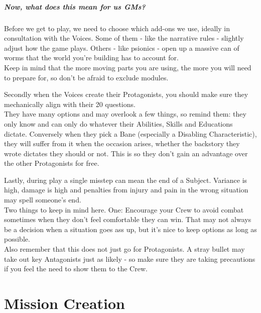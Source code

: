 \documentclass[12pt,a4paper,openany,usenames,dvipsnames]{book}
\begin{document}
	\paragraph{Now, what does this mean for us GMs?}
	\def\hspacepar{5mm}
	\def\vspacepar{-5mm}
	Before we get to play, we need to choose which add-ons we use,
		ideally in consultation with the Voices.
	Some of them - like the narrative rules - slightly adjust how the game plays. Others - like psionics - open up a massive can of worms that the world you're building has to account for.\\
	\hspace*{\hspacepar} Keep in mind that the more moving parts you are using, the more you will need to prepare for, so don't be afraid to exclude modules.\par \vspace{\vspacepar}
	Secondly when the Voices create their Protagonists,
		you should make sure they mechanically align with their 20 questions.\\
	\hspace*{\hspacepar} They have many options and may overlook a few things, so remind them: they only know and can only do whatever their Abilities, Skills and Educations dictate.
	Conversely when they pick a Bane (especially a Disabling Characteristic),
		they will suffer from it when the occasion arises,
		whether the backstory they wrote dictates they should or not.
	This is so they don't gain an advantage over the other Protagonists for free.
	\par \vspace{\vspacepar}
	Lastly, during play a single misstep can mean the end of a Subject.
	Variance is high, damage is high
		and penalties from injury and pain in the wrong situation may spell someone's end.\\
	\hspace*{\hspacepar} Two things to keep in mind here.
		One: Encourage your Crew to avoid combat sometimes
			when they don't feel comfortable they can win.
		That may not always be a decision when a situation goes ass up,
			but it's nice to keep options as long as possible.\\
	\hspace*{\hspacepar} Also remember that this does not just go for Protagonists.
		A stray bullet may take out key Antagonists just as likely
		- so make sure they are taking precautions if you feel the need to show them to the Crew.

	\chapter{Mission Creation}
	
\end{document}
